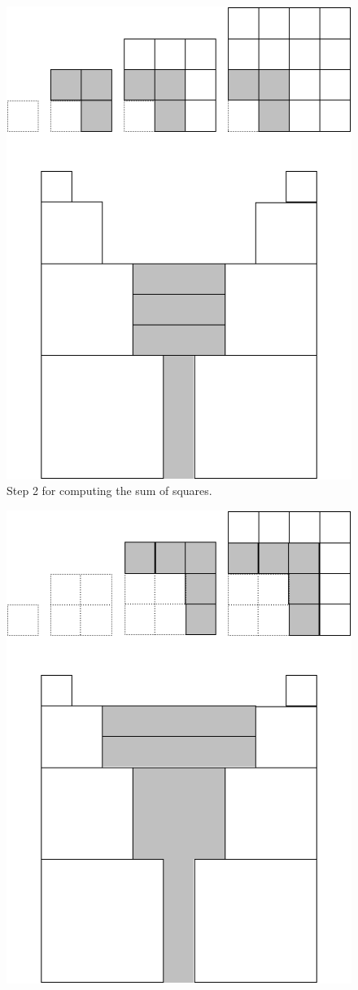 {\begin{figure}[ht]
\begin{center}
       \includegraphics[scale=0.4]{FiguresMaths/SumSquares3}
\caption{Step 2 for computing the sum of squares.}
       \label{fig:sumSquares3}
\end{center}
\end{figure}
\begin{figure}[ht]
\begin{center}
       \includegraphics[scale=0.4]{FiguresMaths/SumSquares4}

\end{center}
\end{figure}}

